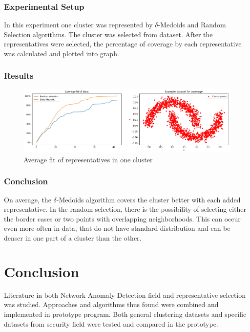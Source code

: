 \documentclass[thesis=B,english]{FITthesis}[2012/10/20]
\def\cbl{\color{blue}} %
\begin{document}
\subsection{Experimental Setup}
In this experiment one cluster was represented by $\delta$-Medoids and Random Selection algorithms.
The cluster was selected from dataset.
After the representatives were selected, the percentage of coverage by each representative was calculated and plotted into graph.


\subsection{Results}

\begin{figure}[H]
  \includegraphics[width=\linewidth]{img/exp5.png}
  \caption{\cbl Average fit of representatives in one cluster}
  \label{img:exp5}
\end{figure}

\subsection{Conclusion}
On average, the $\delta$-Medoids algorithm covers the cluster better with each added representative.
In the random selection, there is the possibility of selecting either the border cases or two points with overlapping neighborhoods.
This can occur even more often in data, that do not have standard distribution and can be denser in one part of a cluster than the other.



\chapter{Conclusion}
Literature in both Network Anomaly Detection field and representative selection was studied.
Approaches and algorithms thus found were combined and implemented in prototype program.
Both general clustering datasets and specific datasets from security field were tested and compared in the prototype.
\end{document}
